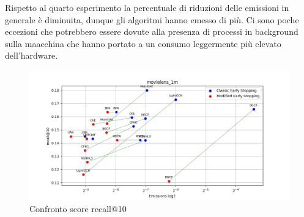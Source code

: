 \begin{table}[H]
    \centering
    \caption{Confronto delle emissioni}
\end{table}

\noindent Rispetto al quarto esperimento la percentuale di riduzioni delle emissioni in generale è diminuita, dunque gli algoritmi hanno emesso di più.
Ci sono poche eccezioni che potrebbero essere dovute alla presenza di processi in background sulla maacchina che hanno portato a un consumo leggermente più elevato dell'hardware.


\begin{figure}[H]
    \centering
    \includegraphics[width=\linewidth, trim=0 0 0 0]{images/recall@10_movielens_1m_40_7_comparison.png}
    \caption{Confronto score recall@10}
    
\end{figure}

